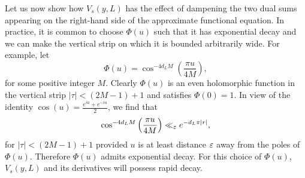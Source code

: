     Let us now show how \(V_{s}(y,L)\) has the effect of dampening the two dual sums appearing on the right-hand side of the approximate functional equation. In practice, it is common to choose \(\Phi(u)\) such that it has exponential decay and we can make the vertical strip on which it is bounded arbitrarily wide. For example, let
    \[
      \Phi(u) = \cos^{-4d_{L}M}\left(\frac{\pi u}{4M}\right),
    \]
    for some positive integer \(M\). Clearly \(\Phi(u)\) is an even holomorphic function in the vertical strip \(|\tau| < (2M-1)+1\) and satisfies \(\Phi(0) = 1\). In view of the identity \(\cos(u) = \frac{e^{iu}+e^{-iu}}{2}\), we find that
    \begin{equation}\label{equ:choice_for_V_decay_estimate}
     \cos^{-4d_{L}M}\left(\frac{\pi u}{4M}\right) \ll_{\varepsilon} e^{-d_{L}\pi|r|},
    \end{equation}
    for \(|\tau| < (2M-1)+1\) provided \(u\) is at least distance \(\varepsilon\) away from the poles of \(\Phi(u)\). Therefore \(\Phi(u)\) admits exponential decay. For this choice of \(\Phi(u)\), \(V_{s}(y,L)\) and its derivatives will possess rapid decay.

